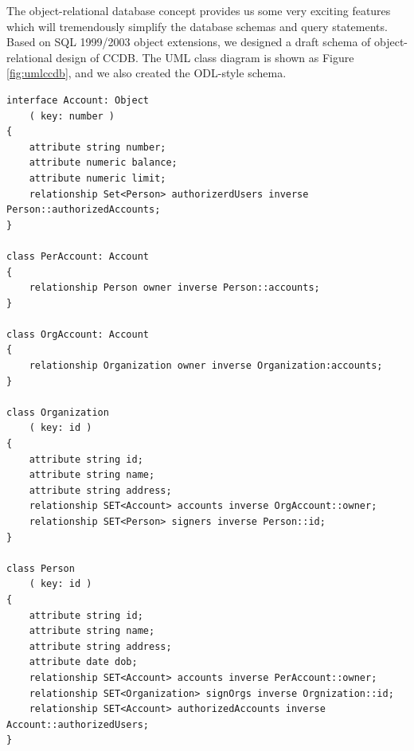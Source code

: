 \documentclass[11pt]{article}
\begin{document}
\par
The object-relational database concept provides us some very exciting features which will tremendously simplify the database schemas and query statements. Based on SQL 1999/2003 object extensions, we designed a draft schema of object-relational design of CCDB. The UML class diagram is shown as Figure \ref{fig:umlccdb}, and we also created the ODL-style schema.

\begin{verbatim}
interface Account: Object
    ( key: number )
{
    attribute string number;
    attribute numeric balance;
    attribute numeric limit;
    relationship Set<Person> authorizerdUsers inverse Person::authorizedAccounts;
}

class PerAccount: Account
{
    relationship Person owner inverse Person::accounts;
}

class OrgAccount: Account
{
    relationship Organization owner inverse Organization:accounts;
}

class Organization
    ( key: id )
{
    attribute string id;
    attribute string name;
    attribute string address;
    relationship SET<Account> accounts inverse OrgAccount::owner;
    relationship SET<Person> signers inverse Person::id;
}

class Person
    ( key: id )
{
    attribute string id;
    attribute string name;
    attribute string address;
    attribute date dob;
    relationship SET<Account> accounts inverse PerAccount::owner;
    relationship SET<Organization> signOrgs inverse Orgnization::id;
    relationship SET<Account> authorizedAccounts inverse Account::authorizedUsers;
}
\end{verbatim}
\end{document}
